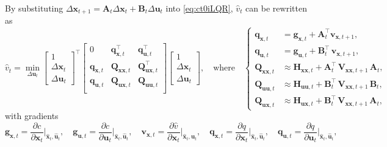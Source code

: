 \documentclass[10pt,a4paper]{article} %
\newcommand{\trsp}{{\scriptscriptstyle\top}}
\begin{document}
By substituting $\Delta\bm{x}_{t+1} = \bm{A}_{t} \Delta\bm{x}_{t} + \bm{B}_{t} \Delta\bm{u}_{t}$ into \eqref{eq:ct0iLQR}, $\hat{v}_{t}$ can be rewritten as
\begin{equation}
	\hat{v}_{t} = \min_{\Delta\bm{u}_{t}}
	\begin{bmatrix}
	1 \\ \Delta\bm{x}_t \\ \Delta\bm{u}_t
	\end{bmatrix}^{\!\!\trsp} \!\!
	\begin{bmatrix}
	0 & \bm{q}_{\bm{x},t}^\trsp & \bm{q}_{\bm{u},t}^\trsp \\
	\bm{q}_{\bm{x},t} & \bm{Q}_{\bm{x}\bm{x},t} & \bm{Q}_{\bm{u}\bm{x},t}^\trsp \\
	\bm{q}_{\bm{u},t} & \bm{Q}_{\bm{u}\bm{x},t} & \bm{Q}_{\bm{u}\bm{u},t} \\
	\end{bmatrix} \!\!
	\begin{bmatrix}
	1 \\ \Delta\bm{x}_t \\ \Delta\bm{u}_t
	\end{bmatrix},
	\quad\text{where}\quad 
	\left\{
	\begin{aligned}
		\bm{q}_{\bm{x},t} &= \bm{g}_{\bm{x},t} + \bm{A}_t^\trsp \bm{v}_{\bm{x},t+1}, \\
		\bm{q}_{\bm{u},t} &= \bm{g}_{\bm{u},t} + \bm{B}_t^\trsp \, \bm{v}_{\bm{x},t+1}, \\
		\bm{Q}_{\bm{x}\bm{x},t} &\approx \bm{H}_{\bm{x}\bm{x},t} + \bm{A}_t^\trsp \, \bm{V}_{\bm{x}\bm{x},t+1} \, \bm{A}_t, \\
		\bm{Q}_{\bm{u}\bm{u},t} &\approx \bm{H}_{\bm{u}\bm{u},t} + \bm{B}_t^\trsp \, \bm{V}_{\bm{x}\bm{x},t+1} \, \bm{B}_t, \\
		\bm{Q}_{\bm{u}\bm{x},t} &\approx \bm{H}_{\bm{u}\bm{x},t} + \bm{B}_t^\trsp \, \bm{V}_{\bm{x}\bm{x},t+1} \, \bm{A}_t, 
	\end{aligned}
	\right.
	\label{eq:qt} %
\end{equation}
with gradients 
\begin{equation*}
	\bm{g}_{\bm{x},t} = \frac{\partial c}{\partial\bm{x}_t}\Big|_{\bm{\hat{x}}_t,\bm{\hat{u}}_t}, \quad
	\bm{g}_{\bm{u},t} = \frac{\partial c}{\partial\bm{u}_t}\Big|_{\bm{\hat{x}}_t,\bm{\hat{u}}_t}, \quad
	\bm{v}_{\bm{x},t} = \frac{\partial \hat{v}}{\partial\bm{x}_t}\Big|_{\bm{\hat{x}}_t,\bm{\hat{u}}_t}, \quad 
	\bm{q}_{\bm{x},t} = \frac{\partial q}{\partial\bm{x}_t}\Big|_{\bm{\hat{x}}_t,\bm{\hat{u}}_t}, \quad 
	\bm{q}_{\bm{u},t} = \frac{\partial q}{\partial\bm{u}_t}\Big|_{\bm{\hat{x}}_t,\bm{\hat{u}}_t},
\end{equation*}
\end{document}
